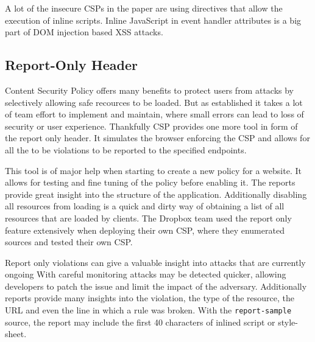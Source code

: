 A lot of the insecure CSPs in the paper are using directives that allow the execution of inline scripts.
Inline JavaScript in event handler attributes is a big part of DOM injection based XSS attacks.



\subsection{Report-Only Header}
Content Security Policy offers many benefits to protect users from attacks by selectively allowing safe recources to be loaded.
But as established it takes a lot of team effort to implement and maintain, where small errors can lead to loss of security or user experience.
Thankfully CSP provides one more tool in form of the report only header.
It simulates the browser enforcing the CSP and allows for all the to be violations to be reported to the specified endpoints.

This tool is of major help when starting to create a new policy for a website.
It allows for testing and fine tuning of the policy before enabling it. 
The reports provide great insight into the structure of the application.
Additionally disabling all resources from loading is a quick and dirty way of obtaining a list of all resources that are loaded by clients.
The Dropbox team used the report only feature extensively when deploying their own CSP, where they enumerated sources and tested their own CSP. \cite{dropboxcsp}


Report only violations can give a valuable insight into attacks that are currently ongoing 
With careful monitoring attacks may be detected quicker, allowing developers to patch the issue and limit the impact of the adversary.
Additionally reports provide many insights into the violation, the type of the resource, the URL and even the line in which a rule was broken.
With the \texttt{report-sample} source, the report may include the first 40 characters of inlined script or style-sheet.


